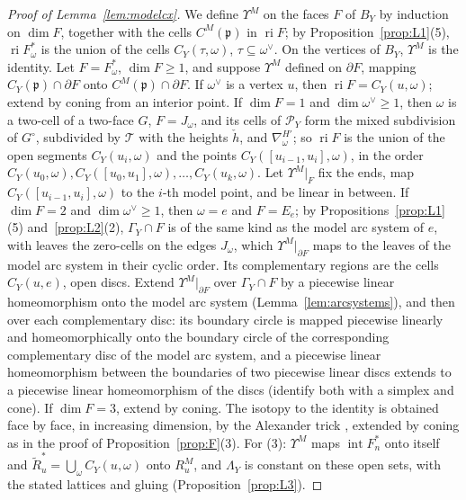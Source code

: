 \begin{proof}[Proof of Lemma~\ref{lem:modelcx}]
We define $\Upsilon^M$ on the faces $F$ of $B_Y$ by induction on $\dim F$, together with the cells $C^M({\mathfrak p})$ in
$\operatorname{ri}F$; by Proposition~\ref{prop:L1}(5), $\operatorname{ri}F^*_\omega$ is the union of the cells
$C_Y(\tau,\omega)$, $\tau\subseteq\omega^\vee$. On the vertices of $B_Y$, $\Upsilon^M$ is the identity. Let
$F=F^*_\omega$, $\dim F\ge1$, and suppose $\Upsilon^M$ defined on $\partial F$, mapping $C_Y({\mathfrak p})\cap\partial F$ onto
$C^M({\mathfrak p})\cap\partial F$. If $\omega^\vee$ is a vertex $u$, then $\operatorname{ri}F=C_Y(u,\omega)$; extend by coning from an
interior point. If $\dim F=1$ and $\dim\omega^\vee\ge1$, then $\omega$ is a two-cell of a two-face $G$, $F=J_\omega$, and
its cells of $\mathscr P_Y$ form the mixed subdivision of $G^\circ$, subdivided by $\mathcal T$ with the heights $\check h$,
and $\nabla^{H'}_\omega$; so $\operatorname{ri}F$ is the union of the open segments $C_Y(u_i,\omega)$ and the points
$C_Y([u_{i-1},u_i],\omega)$, in the order $C_Y(u_0,\omega),C_Y([u_0,u_1],\omega),\dots,C_Y(u_k,\omega)$. Let
$\Upsilon^M|_F$ fix the ends, map $C_Y([u_{i-1},u_i],\omega)$ to the $i$-th model point, and be linear in between. If
$\dim F=2$ and $\dim\omega^\vee\ge1$, then $\omega=e$ and $F=E_e$; by Propositions~\ref{prop:L1}(5) and~\ref{prop:L2}(2),
$\Gamma_Y\cap F$ is of the same kind as the model arc system of $e$, with leaves the zero-cells on the edges $J_\omega$,
which $\Upsilon^M|_{\partial F}$ maps to the leaves of the model arc system in their cyclic order. Its complementary
regions are the cells $C_Y(u,e)$, open discs. Extend $\Upsilon^M|_{\partial F}$ over $\Gamma_Y\cap F$ by a piecewise
linear homeomorphism onto the model arc system (Lemma~\ref{lem:arcsystems}), and then over each complementary disc: its
boundary circle is mapped piecewise linearly and homeomorphically onto the boundary circle of the corresponding
complementary disc of the model arc system, and a piecewise linear homeomorphism between the boundaries of two piecewise
linear discs extends to a piecewise linear homeomorphism of the discs (identify both with a simplex and cone).
If $\dim F=3$, extend by coning. The isotopy to the identity is obtained face by face, in increasing dimension, by the
Alexander trick \cite{Ale23}, extended by coning as in the proof of Proposition~\ref{prop:F}(3). For (3): $\Upsilon^M$
maps $\operatorname{int}F^*_n$ onto itself and $\widetilde R^*_u=\bigcup_\omega C_Y(u,\omega)$ onto $R^M_u$, and
$\Lambda_Y$ is constant on these open sets, with the stated lattices and gluing (Proposition~\ref{prop:L3}).
\end{proof}

